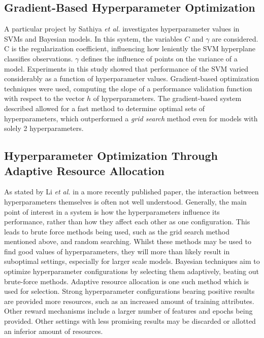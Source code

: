 \subsection{Gradient-Based Hyperparameter Optimization}
 A particular project by  Sathiya \textit{et al.}\cite{SathiyaKeerthi2006} investigates hyperparameter values in SVMs and Bayesian models. In this system, the variables $C$ and $\gamma$ are considered. C is the regularization coefficient, influencing how leniently the SVM hyperplane classifies observations. $\gamma$ defines the influence of points on the variance of a model.  Experiments in this study showed that performance of the SVM varied considerably as a function of hyperparameter values. Gradient-based optimization techniques were used, computing the slope of a performance validation function with respect to the vector $h$ of hyperparameters. The gradient-based system described allowed for a fast method to determine optimal sets of hyperparameters, which outperformed a \textit{grid search} method even for models with solely 2 hyperparameters.


\subsection{Hyperparameter Optimization Through Adaptive Resource Allocation}
 As stated by Li \textit{et al.} in a more recently published paper\cite{Li2017}, the interaction between hyperparameters themselves is often not well understood. Generally, the main point of interest in a system is how the hyperparameters influence its performance, rather than how they affect each other as one configuration. This leads to brute force methods being used, such as the grid search method mentioned above, and random searching. Whilst these methods may be used to find good values of hyperparameters, they will more than likely result in suboptimal settings, especially for larger scale models. Bayesian techniques aim to optimize hyperparameter configurations by selecting them adaptively, beating out brute-force methods. Adaptive resource allocation is one such method which is used for selection. Strong hyperparameter configurations bearing positive results are provided more resources, such as an increased amount of training attributes. Other reward mechanisms include a larger number of features and epochs being provided. Other settings with less promising results may be discarded or allotted an inferior amount of resources. 

